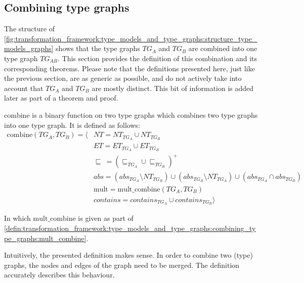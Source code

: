 \subsection{Combining type graphs}
\label{subsec:transformation_framework:type_models_and_type_graphs:combining_type_graphs}

The structure of \cref{fig:transformation_framework:type_models_and_type_graphs:structure_type_models_graphs} shows that the type graphs $TG_A$ and $TG_B$ are combined into one type graph $TG_{AB}$. This section provides the definition of this combination and its corresponding theorems. Please note that the definitions presented here, just like the previous section, are as generic as possible, and do not actively take into account that $TG_{A}$ and $TG_{B}$ are mostly distinct. This bit of information is added later as part of a theorem and proof.

\begin{defin}
\label{defin:transformation_framework:type_models_and_type_graphs:combining_type_graphs:combine}
$\mathrm{combine}$ is a binary function on two type graphs which combines two type graphs into one type graph. It is defined as follows:
\begin{align*}
\mathrm{combine}(TG_A, TG_B) = \langle&
NT = NT_{TG_A} \cup NT_{TG_B} \\&
ET = ET_{TG_A} \cup ET_{TG_B} \\&
\!\!\sqsubseteq\ = (\sqsubseteq_{TG_A} \cup \sqsubseteq_{TG_B})^+ \\&
abs = (abs_{TG_A} \setminus NT_{TG_B}) \cup (abs_{TG_B} \setminus NT_{TG_A}) \cup (abs_{TG_A} \cap abs_{TG_B}) \\&
\mathrm{mult} = \mathrm{mult\_\!combine}(TG_A, TG_B) \\&
contains = contains_{TG_A} \cup contains_{TG_B} \rangle
\end{align*}

In which $\mathrm{mult\_\!combine}$ is given as part of \cref{defin:transformation_framework:type_models_and_type_graphs:combining_type_graphs:mult_combine}.
\end{defin}

Intuitively, the presented definition makes sense. In order to combine two (type) graphs, the nodes and edges of the graph need to be merged. The definition accurately describes this behaviour.

